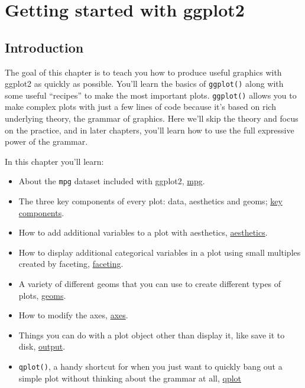 \chapter{Getting started with ggplot2}\label{cha:getting-started}

\section{Introduction}

The goal of this chapter is to teach you how to produce useful graphics
with ggplot2 as quickly as possible. You'll learn the basics of
\texttt{ggplot()} along with some useful ``recipes'' to make the most
important plots. \texttt{ggplot()} allows you to make complex plots with
just a few lines of code because it's based on rich underlying theory,
the grammar of graphics. Here we'll skip the theory and focus on the
practice, and in later chapters, you'll learn how to use the full
expressive power of the grammar.

In this chapter you'll learn:

\begin{itemize}
\item
  About the \texttt{mpg} dataset included with ggplot2,
  \hyperref[sec:fuel-economy-data]{mpg}.
\item
  The three key components of every plot: data, aesthetics and geoms;
  \hyperref[sec:basic-use]{key components}.
\item
  How to add additional variables to a plot with aesthetics,
  \hyperref[aesthetics]{aesthetics}.
\item
  How to display additional categorical variables in a plot using small
  multiples created by faceting,
  \hyperref[sec:qplot-faceting]{faceting}.
\item
  A variety of different geoms that you can use to create different
  types of plots, \hyperref[sec:plot-geoms]{geoms}.
\item
  How to modify the axes, \hyperref[sec:axes]{axes}.
\item
  Things you can do with a plot object other than display it, like save
  it to disk, \hyperref[sec:output]{output}.
\item
  \texttt{qplot()}, a handy shortcut for when you just want to quickly
  bang out a simple plot without thinking about the grammar at all,
  \hyperref[qplot]{qplot}
\end{itemize}


